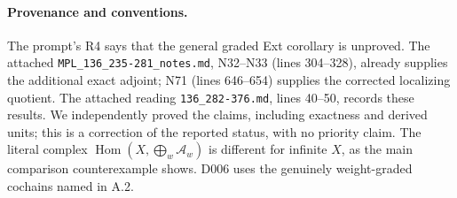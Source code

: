 \paragraph{Provenance and conventions.}
The prompt's R4 says that the general graded Ext corollary is
unproved. The attached \texttt{MPL\_136\_235-281\_notes.md},
N32--N33 (lines 304--328), already supplies the additional exact
adjoint; N71 (lines 646--654) supplies the corrected localizing
quotient. The attached reading \texttt{136\_282-376.md}, lines
40--50, records these results. We independently proved the
claims, including exactness and derived units; this is a correction
of the reported status, with no priority claim. The literal complex
$\operatorname{Hom}(X,\bigoplus_w\mathcal A_w)$ is different for
infinite $X$, as the main comparison counterexample shows. D006
uses the genuinely weight-graded cochains named in A.2.
